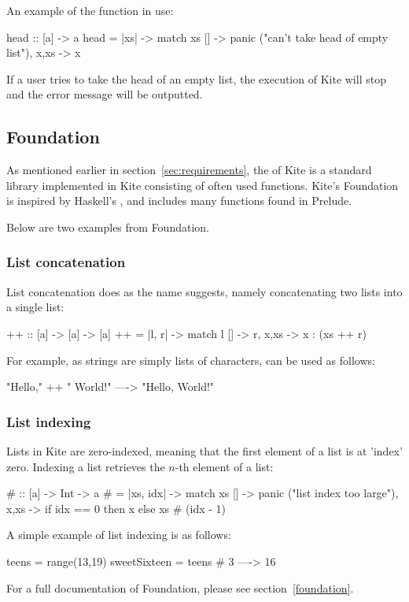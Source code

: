 An example of the  function in use:
\begin{kite}
head :: [a] -> a
head = |xs| -> {
  match xs {
    [] -> panic ("can't take head of empty list"),
    x,xs -> x
  }
}
\end{kite}
If a user tries to take the head of an empty list, the execution of Kite will stop and the error message will be outputted.


\subsection{Foundation}
As mentioned earlier in section~\ref{sec:requirements}, the  of Kite is a standard library implemented in Kite consisting of often used functions. Kite's Foundation is inspired by Haskell's , and includes many functions found in
Prelude.

Below are two examples from Foundation.

\subsubsection{List concatenation}
List concatenation does as the name suggests, namely concatenating two lists into a single list:

\begin{kite}
{++} :: [a] -> [a] -> [a]
{++} = |l, r| -> {
  match l {
    [] -> r,
    x,xs -> x : (xs ++ r)
  }
}
\end{kite}

For example, as strings are simply lists of characters, \code{++} can be used as follows:

\begin{kite}
"Hello," ++ " World!" ----> "Hello, World!"
\end{kite}

\subsubsection{List indexing}
Lists in Kite are zero-indexed, meaning that the first element of a list is at 'index' zero. Indexing a list retrieves the $n$-th element of a list:

\begin{kite}
{#} :: [a] -> Int -> a
{#} = |xs, idx| -> {
  match xs {
    [] -> panic ("list index too large"),
    x,xs -> if idx == 0 then x else xs # (idx - 1)
  }
}
\end{kite}

A simple example of list indexing is as follows:

\begin{kite}
teens = range(13,19)
sweetSixteen = teens # 3 ----> 16
\end{kite}

For a full documentation of Foundation, please see section~\ref{foundation}.
